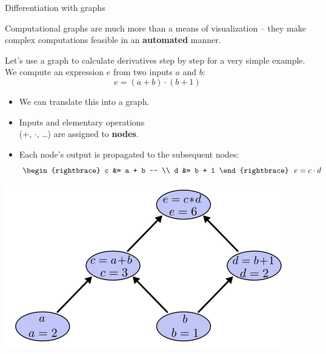
\begin{vbframe}{Differentiation with graphs}

\small
Computational graphs are much more than a means of visualization -- they make 
complex computations feasible in an \textbf{automated} manner.
\vfill

Let's use a graph to calculate derivatives step by step for a very simple 
example. We compute an expression $e$ from 
two inputs $a$ and $b$:
$$e = (a + b) \cdot (b + 1)$$

\vfill

\begin{minipage}[c]{0.55\textwidth}
  \raggedright \small
  \begin{itemize}
    \item We can translate this into a graph.
    \item Inputs and elementary 
    operations \\($+$, $\cdot$, \dots) are assigned to \textbf{nodes}.
    \item Each node's output is propagated to the subsequent nodes:
    \begin{equation*}
      \begin{rightbrace}
          c &= a + b ~~ \\
          d &= b + 1
      \end{rightbrace}
      ~~ e = c \cdot d
    \end{equation*}
  \end{itemize}
\end{minipage}%
\begin{minipage}{0.05\textwidth}
\phantom{foo}
\end{minipage}%
\begin{minipage}[c]{0.4\textwidth}
  \includegraphics[width=\textwidth]{figure_man/compgraph_example_1}
  

\end{minipage}
\end{vbframe}
